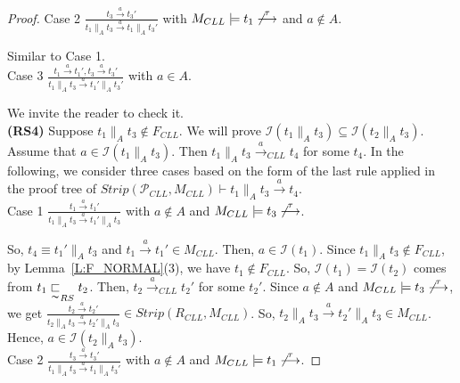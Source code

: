 \documentclass{elsarticle}
\theoremstyle{plain}
\theoremstyle{definition}
\begin{document}
\begin{proof}
\noindent Case 2 $\frac{t_3 \stackrel{a}{\longrightarrow} t_3'}{t_1 \parallel_A t_3 \stackrel{a}{\longrightarrow} t_1\parallel_A t_3'}$ with $M_{{CLL}} \models t_1 \not\stackrel{\tau}{\longrightarrow}$ and $a\notin A$.

 Similar to Case 1.\\

\noindent Case 3 $\frac{t_1 \stackrel{a}{\longrightarrow} t_1',t_3 \stackrel{a}{\longrightarrow} t_3'}{t_1 \parallel_A t_3 \stackrel{a}{\longrightarrow} t_1'\parallel_A t_3'}$ with $a\in A$.

We invite the reader to check it.\\

\textbf{(RS4)}  Suppose $t_1 \parallel_A t_3 \notin F_{{CLL}}$.
    We will prove ${\mathcal I}(t_1 \parallel_A t_3 ) \subseteq {\mathcal I}(t_2 \parallel_A t_3 ) $.
    Assume that $a \in {\mathcal I}(t_1 \parallel_A t_3 )$. Then $t_1\parallel_A t_3 \stackrel{a}{\longrightarrow}_{{CLL}} t_4$ for some $t_4$. In the following, we consider three cases based on the form of the last rule applied in the proof tree of  $Strip({\mathcal P}_{CLL},M_{{CLL}}) \vdash t_1\parallel_A t_3 \stackrel{a}{\longrightarrow} t_4$.\\

\noindent    Case 1 $\frac{t_1 \stackrel{a}{\longrightarrow} t_1'}{t_1 \parallel_A t_3 \stackrel{a}{\longrightarrow} t_1'\parallel_A t_3}$ with $a\notin A$ and $M_{{CLL}} \models t_3 \not\stackrel{\tau}{\longrightarrow}$.

    So, $t_4 \equiv t_1'\parallel_A t_3$ and $t_1 \stackrel{a}{\longrightarrow} t_1' \in M_{{CLL}}$. Then, $ a \in {\mathcal I}(t_1 )$.
    Since $t_1 \parallel_A t_3 \notin F_{{CLL}}$, by Lemma~\ref{L:F_NORMAL}(3), we have $t_1 \notin F_{{CLL}}$.
    So, ${\mathcal I}(t_1 ) = {\mathcal I}(t_2 ) $ comes from $t_1 \underset{\thicksim}{\sqsubset}_{RS} t_2$.
    Then, $t_2 \stackrel{a}{\longrightarrow}_{{CLL}} t_2'$ for some $t_2'$.
    Since $a\notin A$ and $M_{{CLL}} \models t_3 \not\stackrel{\tau}{\longrightarrow}$, we get $\frac{t_2 \stackrel{a}{\longrightarrow} t_2'}{t_2 \parallel_A t_3 \stackrel{a}{\longrightarrow} t_2'\parallel_A t_3} \in Strip(R_{CLL},M_{{CLL}})$.
    So, $t_2 \parallel_A t_3 \stackrel{a}{\longrightarrow} t_2'\parallel_A t_3 \in M_{{CLL}}$.
    Hence, $a \in {\mathcal I}(t_2 \parallel_A t_3 )$.\\

\noindent    Case 2 $\frac{t_3 \stackrel{a}{\longrightarrow} t_3'}{t_1 \parallel_A t_3 \stackrel{a}{\longrightarrow}t_1 \parallel_A t_3'}$ with $a\notin A$ and $M_{{CLL}} \models t_1 \not\stackrel{\tau}{\longrightarrow}$.


\end{proof}
\end{document}
